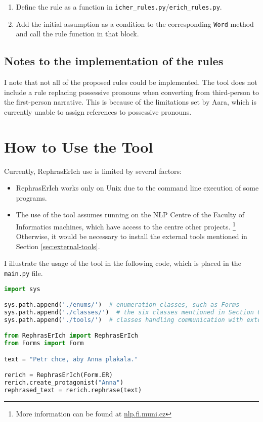 \begin{enumerate}
	\item Define the rule as a function in \texttt{icher\_rules.py}/\texttt{erich\_rules.py}.
	\item Add the initial assumption as a condition to the corresponding \texttt{Word} method and call the rule function in that block.
\end{enumerate}

\subsection*{Notes to the implementation of the rules}

I note that not all of the proposed rules could be implemented. The tool does not include a rule replacing possessive pronouns when converting from third-person to the first-person narrative. This is because of the limitations set by Aara, which is currently unable to assign references to possessive pronouns.

\section{How to Use the Tool}

Currently, RephrasErIch use is limited by several factors:

\begin{itemize}
	\item RephrasErIch works only on Unix due to the command line execution of some programs.
	\item The use of the tool assumes running on the NLP Centre of the Faculty of Informatics machines, which have access to the centre other projects. \footnote{More information can be found at \href{https://nlp.fi.muni.cz}{nlp.fi.muni.cz}} Otherwise, it would be necessary to install the external tools mentioned in Section \ref{sec:external-tools}.
\end{itemize}

I illustrate the usage of the tool in the following code, which is placed in the \texttt{main.py} file.
\newline

\begin{lstlisting}[language=Python]
import sys

sys.path.append('./enums/')  # enumeration classes, such as Forms
sys.path.append('./classes/')  # the six classes mentioned in Section 6.2
sys.path.append('./tools/')  # classes handling communication with external tools

from RephrasErIch import RephrasErIch
from Forms import Form

text = "Petr chce, aby Anna plakala."

rerich = RephrasErIch(Form.ER)
rerich.create_protagonist("Anna")
rephrased_text = rerich.rephrase(text)
\end{lstlisting}



